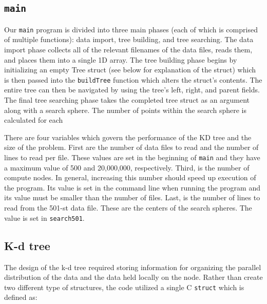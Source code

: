 \documentclass{article}
\begin{document}
\subsection{\texttt{main}}
Our \texttt{main} program is divided into three main phases (each of which is comprised of multiple functions): data import, tree building, and tree searching. The data import phase collects all of the relevant filenames of the data files, reads them, and places them into a single 1D array. The tree building phase begins by initializing an empty Tree struct (see below for explanation of the struct) which is then passed into the \texttt{buildTree} function which alters the struct's contents. The entire tree can then be navigated by using the tree's left, right, and parent fields. The final tree searching phase takes the completed tree struct as an argument along with a search sphere. The number of points within the search sphere is calculated for each

There are four variables which govern the performance of the KD tree and the size of the problem. First are the number of data files to read and the number of lines to read per file. These values are set in the beginning of \texttt{main} and they have a maximum value of 500 and 20,000,000, respectively. Third, is the number of compute nodes. In general, increasing this number should speed up execution of the program. Its value is set in the command line when running the program and its value must be smaller than the number of files. Last, is the number of lines to read from the 501-st data file. These are the centers of the search spheres. The value is set in \texttt{search501}.






%
%

\subsection{K-d tree}
%
%

The design of the k-d tree required storing information for organizing the parallel distribution of the data and the data held locally on the node. Rather than create two different type of structures, the code utilized a single C \texttt{struct} which is defined as:
\end{document}
